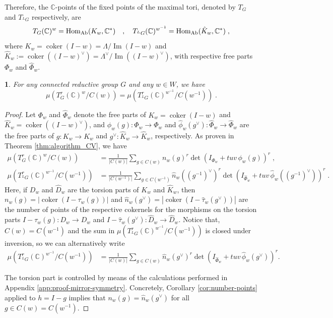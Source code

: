 \documentclass[11pt,english]{amsart}
\numberwithin{equation}{section}
\numberwithin{figure}{section}
\theoremstyle{plain}
\newtheorem{thm}{\protect\theoremname}[section]
\theoremstyle{plain}
\theoremstyle{definition}
\theoremstyle{remark}
\DeclareMathOperator{\image}{Im}
\newcommand{\CC}{\mathbb{C}}
\newcommand{\coker}{\operatorname{coker}}
\newcommand{\Hom}{\operatorname{Hom}}
\newcommand{\Ab}{\textup{Ab}}
\providecommand{\theoremname}{Theorem}
\begin{document}
Therefore, the $\CC$-points of the fixed points of the maximal tori, denoted by $T_{G}$ and $T_{^LG}$ respectively, are
$$
    T_G(\CC)^w = \Hom_{\Ab}(K_w, \CC^*)\quad , \quad T_{^LG}(\CC)^{w^{-1}} = \Hom_{\Ab}(\hat{K}_{w}, \CC^*)\; ,
$$
where $K_w = \coker(I-w) = \Lambda/\image(I-w)$ and $\hat{K}_w := \coker((I-w)^\vee) = \Lambda^\vee/\image((I-w)^\vee)$, with respective free parts $\Phi_w$ and $\hat{\Phi}_w$.


\begin{thm}\label{thm:equality-terms}
    For any connected reductive group $G$ and any $w \in W$, we have
    $$
        \mu(T^r_G(\CC)^w/C(w)) = \mu(T^r_{^LG}(\CC)^{w^{-1}}/C(w^{-1}))\; .
    $$
\end{thm}

\begin{proof}
Let $\Phi_w$ and $\hat{\Phi}_w$ denote the free parts of $K_w = \coker(I-w)$ and $\hat{K}_w = \coker((I-w)^\vee)$, and $\phi_w(g): \Phi_w \to \Phi_w$ and $\hat{\phi}_w(g^\vee):\hat{\Phi}_w \to \hat{\Phi}_w$ are the free parts of $g: K_w \to K_w$ and $g^\vee: \hat{K}_w \to \hat{K}_w$, respectively. As proven in Theorem \ref{thm:algorithm_CV}, we have
\begin{align*}
    \mu(T^r_G(\CC)^w/C(w)) &= \frac{1}{|C(w)|}\sum_{g \in C(w)} n_{w}(g)^r \det\left(I_{\Phi_w} + tuv\,\phi_w(g)\right)^r\; ,\\
    \mu(T^r_{^LG}(\CC)^{w^{-1}}/C(w^{-1})) &= \frac{1}{|C(w^{-1})|}\sum_{g \in C(w^{-1})} \hat{n}_{w}((g^{-1})^\vee)^r \det\left(I_{\hat{\Phi}_w} + tuv\,\hat{\phi}_w((g^{-1})^\vee)\right)^r\; .
\end{align*}
Here, if $D_w$ and $\hat{D}_{w}$ are the torsion parts of $K_w$ and $\hat{K}_w$, then $n_w(g) = |\coker(I-\tau_w(g))|$ and $\hat{n}_{w}(g^\vee) = |\coker(I-\hat{\tau}_w(g^\vee))|$ are the number of points of the respective cokernels for the morphisms on the torsion parts $I-\tau_w(g): D_w \to D_w$ and $I-\hat{\tau}_w(g^\vee): \hat{D}_w \to \hat{D}_w$. Notice that, $C(w) = C(w^{-1})$ and the sum in $\mu(T^r_{^LG}(\CC)^{w^{-1}}/C(w^{-1}))$ is closed under inversion, so we can alternatively write 
\begin{align*}
    \mu(T^r_{^LG}(\CC)^{w^{-1}}/C(w^{-1})) &= \frac{1}{|C(w)|}\sum_{g \in C(w)} \hat{n}_{w}(g^\vee)^r \det\left(I_{\hat{\Phi}_w} + tuv\,\hat{\phi}_w(g^\vee)\right)^r.
\end{align*}


The torsion part is controlled by means of the calculations performed in Appendix \ref{app:proof-mirror-symmetry}. Concretely, Corollary \ref{cor:number-points} applied to $h = I-g$ implies that $n_w(g) = \hat{n}_{w}(g^\vee)$ for all $g \in C(w) = C(w^{-1})$.


\end{proof}
\end{document}
